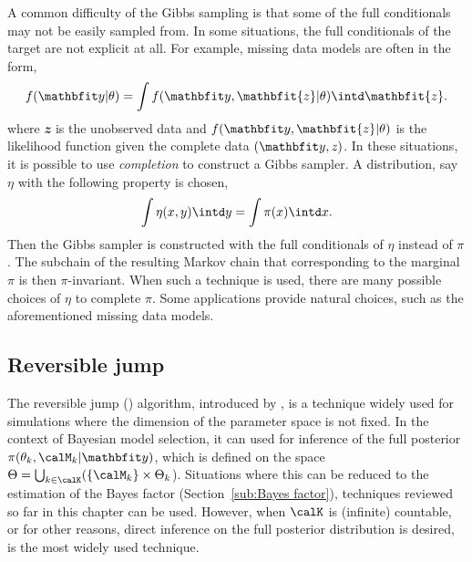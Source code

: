 A common difficulty of the Gibbs sampling is that some of the full
conditionals may not be easily sampled from. In some situations, the full
conditionals of the target are not explicit at all. For example, missing data
models are often in the form,
\begin{equation*}
  f(\data|\theta) = \int f(\data, \mathbfit{z}|\theta)\intd \mathbfit{z}.
\end{equation*}
where $\mathbfit{z}$ is the unobserved data and $f(\data,\mathbfit{z}|\theta)$
is the likelihood function given the complete data $(\data,\mathit{z})$. In
these situations, it is possible to use \emph{completion} to construct a Gibbs
sampler. A distribution, say $\eta$ with the following property is chosen,
\begin{equation}
  \int\eta(x,y)\intd y = \int\pi(x)\intd x.
\end{equation}
Then the Gibbs sampler is constructed with the full conditionals of $\eta$
instead of $\pi$. The subchain of the resulting Markov chain that
corresponding to the marginal $\pi$ is then $\pi$-invariant. When such a
technique is used, there are many possible choices of $\eta$ to complete
$\pi$. Some applications provide natural choices, such as the aforementioned
missing data models.

\subsection{Reversible jump \protect\mcmc}
\label{sub:Reversible jump mcmc}

The reversible jump \mcmc (\rjmcmc) algorithm, introduced by
\cite{Green:1995dg}, is a technique widely used for simulations where the
dimension of the parameter space is not fixed. In the context of Bayesian
model selection, it can used for inference of the full posterior
$\pi(\theta_k,\calM_k|\data)$, which is defined on the space $\Theta =
\bigcup_{k\in\calK}(\{\calM_k\}\times\Theta_k$). Situations where this can be
reduced to the estimation of the Bayes factor (Section~\ref{sub:Bayes
  factor}), techniques reviewed so far in this chapter can be used. However,
when $\calK$ is (infinite) countable, or for other reasons, direct inference
on the full posterior distribution is desired, \rjmcmc is the most widely used
technique.

